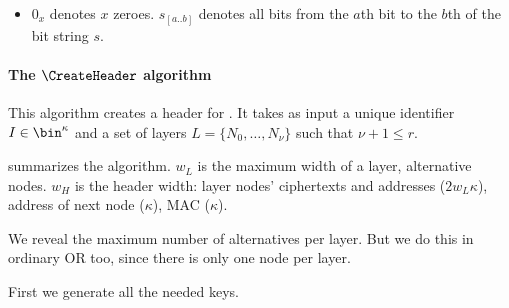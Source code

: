 \begin{itemize}
  \item \(0_x\) denotes \(x\) zeroes.
    \(s_{[a..b]}\) denotes all bits from the \(a\)th bit to the \(b\)th of the 
    bit string \(s\).
\end{itemize}

\paragraph*{The \(\CreateHeader\) algorithm}


This algorithm creates a header for .
It takes as input a unique identifier \(I\in \bin^\kappa\) and a set of layers 
\(L = \{N_0, \dotsc, N_\nu\}\) such that \(\nu+1\leq r\).

 summarizes the algorithm.
\(w_L\) is the maximum width of a layer, \ie alternative nodes.
\(w_H\) is the header width:
layer nodes' ciphertexts and addresses ($2w_L\kappa$),
address of next node ($\kappa$),
\ac{MAC} ($\kappa$).

We reveal the maximum number of alternatives per layer.
But we do this in ordinary \ac{OR} too, since there is only one node per layer.

First we generate all the needed keys.

